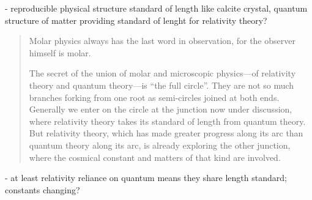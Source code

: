 - reproducible physical structure standard of length like calcite crystal, quantum structure of matter providing standard of lenght for relativity theory?

\begin{quote}
    Molar physics always has the last word in observation, for the observer himself is molar.
    
    The secret of the union of molar and microscopic physics---of relativity theory and quantum theory---is ``the full circle''.  They are not so much branches forking from one root as semi-circles joined at both ends.  Generally we enter on the circle at the junction now under discussion, where relativity theory takes its standard of length from quantum theory.  But relativity theory, which has made greater progress along its arc than quantum theory along its arc, is already exploring the other junction, where the cosmical constant and matters of that kind are involved.  
    
    \citep[p. 77]{Eddington1939}
\end{quote}

- at least relativity reliance on quantum means they share length standard; constants changing?

